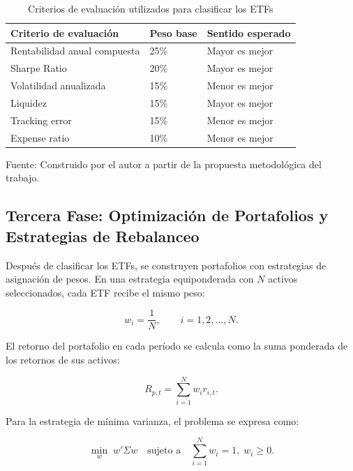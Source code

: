 \documentclass[12pt,letterpaper]{article}
\newcommand{\fuente}[1]{\begin{center}\small Fuente: #1\end{center}}
\begin{document}
\begin{table}[H]
\centering
\caption{Criterios de evaluación utilizados para clasificar los ETFs}
\label{tab:criterios_evaluacion}
\begin{tabular}{p{7cm}p{3cm}p{4cm}}
\toprule
\textbf{Criterio de evaluación} & \textbf{Peso base} & \textbf{Sentido esperado} \\
\midrule
Rentabilidad anual compuesta & 25\% & Mayor es mejor \\
Sharpe Ratio & 20\% & Mayor es mejor \\
Volatilidad anualizada & 15\% & Menor es mejor \\
Liquidez & 15\% & Mayor es mejor \\
Tracking error & 15\% & Menor es mejor \\
Expense ratio & 10\% & Menor es mejor \\
\bottomrule
\end{tabular}
\end{table}
\fuente{Construido por el autor a partir de la propuesta metodológica del trabajo.}

\subsection{Tercera Fase: Optimización de Portafolios y Estrategias de Rebalanceo}

Después de clasificar los ETFs, se construyen portafolios con estrategias de asignación de pesos. En una estrategia equiponderada con $N$ activos seleccionados, cada ETF recibe el mismo peso:

\begin{equation}
w_i = \frac{1}{N}, \qquad i=1,2,\ldots,N.
\label{eq:equal_weight}
\end{equation}

El retorno del portafolio en cada período se calcula como la suma ponderada de los retornos de sus activos:

\begin{equation}
R_{p,t} = \sum_{i=1}^{N} w_i r_{i,t}.
\label{eq:retorno_portafolio}
\end{equation}

Para la estrategia de mínima varianza, el problema se expresa como:

\begin{equation}
\min_{w} \; w'\Sigma w
\quad \text{sujeto a} \quad
\sum_{i=1}^{N} w_i = 1, \; w_i \geq 0.
\label{eq:minvar}
\end{equation}
\end{document}

